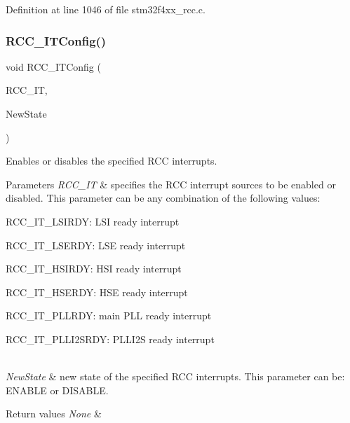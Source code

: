Definition at line 1046 of file stm32f4xx\+\_\+rcc.\+c.

\mbox{\label{group___r_c_c_gaa953aa226e9ce45300d535941e4dfe2f}} 
\subsubsection{\texorpdfstring{R\+C\+C\+\_\+\+I\+T\+Config()}{RCC\_ITConfig()}}
{\footnotesize\ttfamily void R\+C\+C\+\_\+\+I\+T\+Config (\begin{DoxyParamCaption}\item[{uint8\+\_\+t}]{R\+C\+C\+\_\+\+IT,  }\item[{Functional\+State}]{New\+State }\end{DoxyParamCaption})}



Enables or disables the specified R\+CC interrupts. 


\begin{DoxyParams}{Parameters}
{\em R\+C\+C\+\_\+\+IT} & specifies the R\+CC interrupt sources to be enabled or disabled. This parameter can be any combination of the following values\+: \begin{DoxyItemize}
\item R\+C\+C\+\_\+\+I\+T\+\_\+\+L\+S\+I\+R\+DY\+: L\+SI ready interrupt \item R\+C\+C\+\_\+\+I\+T\+\_\+\+L\+S\+E\+R\+DY\+: L\+SE ready interrupt \item R\+C\+C\+\_\+\+I\+T\+\_\+\+H\+S\+I\+R\+DY\+: H\+SI ready interrupt \item R\+C\+C\+\_\+\+I\+T\+\_\+\+H\+S\+E\+R\+DY\+: H\+SE ready interrupt \item R\+C\+C\+\_\+\+I\+T\+\_\+\+P\+L\+L\+R\+DY\+: main P\+LL ready interrupt \item R\+C\+C\+\_\+\+I\+T\+\_\+\+P\+L\+L\+I2\+S\+R\+DY\+: P\+L\+L\+I2S ready interrupt \end{DoxyItemize}
\\
\hline
{\em New\+State} & new state of the specified R\+CC interrupts. This parameter can be\+: E\+N\+A\+B\+LE or D\+I\+S\+A\+B\+LE. \\
\hline
\end{DoxyParams}

\begin{DoxyRetVals}{Return values}
{\em None} & \\
\hline
\end{DoxyRetVals}


